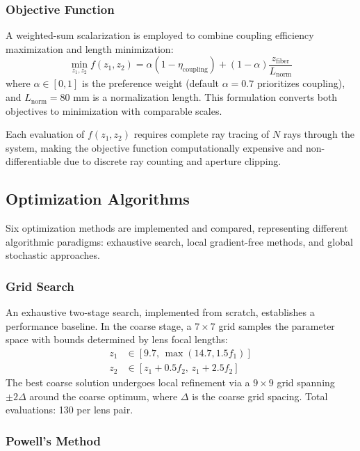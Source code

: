 \subsubsection{Objective Function}

A weighted-sum scalarization is employed to combine coupling efficiency maximization and length minimization:
\begin{equation}
\min_{z_1,z_2} f(z_1, z_2) = \alpha(1 - \eta_{\text{coupling}}) + (1-\alpha)\frac{z_{\text{fiber}}}{L_{\text{norm}}}
\end{equation}
where $\alpha \in [0,1]$ is the preference weight (default $\alpha = 0.7$ prioritizes coupling), and $L_{\text{norm}} = 80$ mm is a normalization length. This formulation converts both objectives to minimization with comparable scales.

Each evaluation of $f(z_1, z_2)$ requires complete ray tracing of $N$ rays through the system, making the objective function computationally expensive and non-differentiable due to discrete ray counting and aperture clipping.

\subsection{Optimization Algorithms}

Six optimization methods are implemented and compared, representing different algorithmic paradigms: exhaustive search, local gradient-free methods, and global stochastic approaches.

\subsubsection{Grid Search}

An exhaustive two-stage search, implemented from scratch, establishes a performance baseline. In the coarse stage, a $7 \times 7$ grid samples the parameter space with bounds determined by lens focal lengths:
\begin{align}
z_1 &\in [9.7, \, \max(14.7, 1.5f_1)] \\
z_2 &\in [z_1 + 0.5f_2, \, z_1 + 2.5f_2]
\end{align}
The best coarse solution undergoes local refinement via a $9 \times 9$ grid spanning $\pm 2\Delta$ around the coarse optimum, where $\Delta$ is the coarse grid spacing. Total evaluations: 130 per lens pair.

\subsubsection{Powell's Method}

